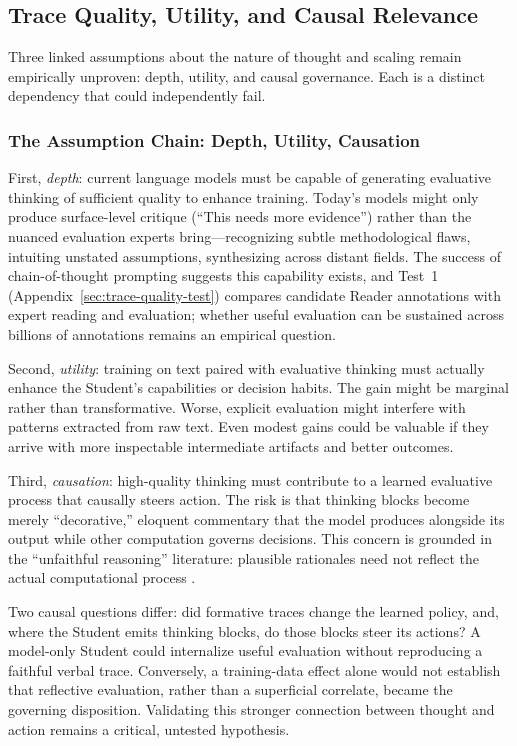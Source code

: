 \documentclass[11pt]{article}
\begin{document}
\subsection{Trace Quality, Utility, and Causal Relevance}

Three linked assumptions about the nature of thought and scaling remain empirically unproven: depth, utility, and causal governance. Each is a distinct dependency that could independently fail.

\subsubsection{The Assumption Chain: Depth, Utility, Causation}\label{sec:assumption-chain}

First, \emph{depth}: current language models must be capable of generating evaluative thinking of sufficient quality to enhance training. Today's models might only produce surface-level critique (``This needs more evidence'') rather than the nuanced evaluation experts bring---recognizing subtle methodological flaws, intuiting unstated assumptions, synthesizing across distant fields. The success of chain-of-thought prompting suggests this capability exists, and Test~1 (Appendix~\ref{sec:trace-quality-test}) compares candidate Reader annotations with expert reading and evaluation; whether useful evaluation can be sustained across billions of annotations remains an empirical question.

Second, \emph{utility}: training on text paired with evaluative thinking must
actually enhance the Student's capabilities or decision habits. The gain might
be marginal rather than transformative. Worse, explicit evaluation might
interfere with patterns extracted from raw text. Even modest gains could be
valuable if they arrive with more inspectable intermediate artifacts and better
outcomes.

Third, \emph{causation}: high-quality thinking must contribute to a learned evaluative process that causally steers action. The risk is that thinking blocks become merely ``decorative,'' eloquent commentary that the model produces alongside its output while other computation governs decisions. This concern is grounded in the ``unfaithful reasoning'' literature: plausible rationales need not reflect the actual computational process \cite{turpin2023language, lanham2023measuring}.

Two causal questions differ: did formative traces change the learned policy, and, where the Student emits thinking blocks, do those blocks steer its actions? A model-only Student could internalize useful evaluation without reproducing a faithful verbal trace. Conversely, a training-data effect alone would not establish that reflective evaluation, rather than a superficial correlate, became the governing disposition. Validating this stronger connection between thought and action remains a critical, untested hypothesis.
\end{document}
